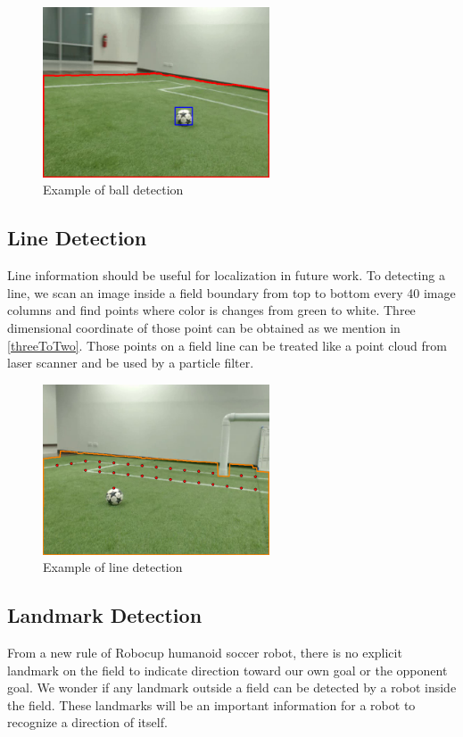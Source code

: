 	\begin{figure}[H]
		\centering
		\includegraphics[width=0.6\textwidth]{image/ballDetection.png}
		\caption{Example of ball detection}
		\label{ball}
	\end{figure}
	
	\subsection{Line Detection}
	Line information should be useful for localization in future work. To detecting a line, we scan an image inside a field boundary from top to bottom every 40 image columns and find points where color is changes from green to white. Three dimensional coordinate of those point can be obtained as we mention in \ref{threeToTwo}. Those points on a field line can be treated like a point cloud from laser scanner and be used by a particle filter.
	\begin{figure}[H]
		\centering
		\includegraphics[width=0.6\textwidth]{image/lineDetection.png}
		\caption{Example of line detection}
		\label{fieldBoundary}
	\end{figure}
	\subsection{Landmark Detection}
	From a new rule of Robocup humanoid soccer robot, there is no explicit landmark on the field to indicate direction toward our own goal or the opponent goal. We wonder if any landmark outside a field can be detected by a robot inside the field. These landmarks will be an important information for a robot to recognize a direction of itself.
